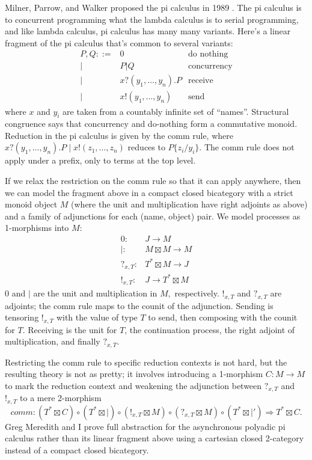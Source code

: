 \documentclass[12pt,twoside,openright]{report}
\newcommand{\maps}{\colon}
\begin{document}
Milner, Parrow, and Walker proposed the pi calculus in 1989 \cite{MPW89}.  The pi calculus is to concurrent programming what the lambda calculus is to serial programming, and like lambda calculus, pi calculus has many many variants.  Here's a linear fragment of the pi calculus that's common to several variants:
\[\begin{array}{rll}
  P,Q ::= & 0 & \mbox{do nothing} \\
  |& P | Q & \mbox{concurrency}\\
  |& x?(y_1, \ldots, y_n).P & \mbox{receive}\\
  |& x!(y_1, \ldots, y_n) & \mbox{send}
\end{array}\]
where $x$ and $y_i$ are taken from a countably infinite set of ``names''.  Structural congruence says that concurrency and do-nothing form a commutative monoid.  Reduction in the pi calculus is given by the comm rule, where $x?(y_1, \ldots, y_n).P \;|\; x!(z_1, \ldots, z_n)$ reduces to $P\{z_i / y_i\}$.  The comm rule does not apply under a prefix, only to terms at the top level.

If we relax the restriction on the comm rule so that it can apply anywhere, then we can model the fragment above in a compact closed bicategory with a strict monoid object $M$ (where the unit and multiplication have right adjoints as above) and a family of adjunctions for each (name, object) pair.  We model processes as 1-morphisms into $M$:
\[\begin{array}{rl}
0\maps & J \to M\\
|\maps & M \boxtimes M \to M\\
?_{x, T}\maps & T^* \boxtimes M \to J\\
!_{x, T}\maps & J \to T^* \boxtimes M
\end{array}\]
$0$ and $|$ are the unit and multiplication in $M,$ respectively.  $!_{x, T}$ and $?_{x, T}$ are adjoints; the comm rule maps to the counit of the adjunction.  Sending is tensoring $!_{x,T}$ with the value of type $T$ to send, then composing with the counit for $T.$  Receiving is the unit for $T$, the continuation process, the right adjoint of multiplication, and finally $?_{x, T}.$

Restricting the comm rule to specific reduction contexts is not hard, but the resulting theory is not as pretty; it involves introducing a 1-morphism $C\maps M \to M$ to mark the reduction context and weakening the adjunction between $?_{x, T}$ and $!_{x, T}$ to a mere 2-morphism 
\[ comm\maps (T^* \boxtimes C) \circ (T^* \boxtimes |) \circ (!_{x, T} \boxtimes M) \circ (?_{x, T} \boxtimes M) \circ (T^* \boxtimes |') \Rightarrow T^* \boxtimes C.\]  Greg Meredith and I \cite{AC} prove full abstraction for the asynchronous polyadic pi calculus rather than its linear fragment above using a cartesian closed 2-category instead of a compact closed bicategory.
\end{document}
